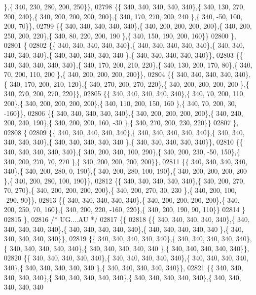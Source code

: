 \begin{DoxyCode}
      \},\{ 340, 230, 280, 200, 250\}\},
02798 \{\{ 340, 340, 340, 340, 340\},\{ 340, 130, 270, 200, 240\},\{ 340, 200, 200, 200, 200\},\{ 340, 170, 270, 200, 240
      \},\{ 340, -50, 100, 200,  70\}\},
02799 \{\{ 340, 340, 340, 340, 340\},\{ 340, 200, 200, 200, 200\},\{ 340, 200, 250, 200, 220\},\{ 340,  80, 220, 200, 190
      \},\{ 340, 150, 190, 200, 160\}\}
02800 \},
02801 \{
02802 \{\{ 340, 340, 340, 340, 340\},\{ 340, 340, 340, 340, 340\},\{ 340, 340, 340, 340, 340\},\{ 340, 340, 340, 340, 340
      \},\{ 340, 340, 340, 340, 340\}\},
02803 \{\{ 340, 340, 340, 340, 340\},\{ 340, 170, 200, 210, 220\},\{ 340, 130, 200, 170,  80\},\{ 340,  70, 200, 110, 200
      \},\{ 340, 200, 200, 200, 200\}\},
02804 \{\{ 340, 340, 340, 340, 340\},\{ 340, 170, 200, 210, 120\},\{ 340, 270, 200, 270, 220\},\{ 340, 200, 200, 200, 200
      \},\{ 340, 270, 200, 270, 220\}\},
02805 \{\{ 340, 340, 340, 340, 340\},\{ 340,  70, 200, 110, 200\},\{ 340, 200, 200, 200, 200\},\{ 340, 110, 200, 150, 160
      \},\{ 340,  70, 200,  30, -160\}\},
02806 \{\{ 340, 340, 340, 340, 340\},\{ 340, 200, 200, 200, 200\},\{ 340, 240, 200, 240, 190\},\{ 340, 200, 200, 160, -30
      \},\{ 340, 270, 200, 230, 220\}\}
02807 \},
02808 \{
02809 \{\{ 340, 340, 340, 340, 340\},\{ 340, 340, 340, 340, 340\},\{ 340, 340, 340, 340, 340\},\{ 340, 340, 340, 340, 340
      \},\{ 340, 340, 340, 340, 340\}\},
02810 \{\{ 340, 340, 340, 340, 340\},\{ 340, 200, 340, 100, 290\},\{ 340, 200, 230, -50, 150\},\{ 340, 200, 270,  70, 270
      \},\{ 340, 200, 200, 200, 200\}\},
02811 \{\{ 340, 340, 340, 340, 340\},\{ 340, 200, 280,   0, 190\},\{ 340, 200, 280, 100, 190\},\{ 340, 200, 200, 200, 200
      \},\{ 340, 200, 280, 100, 190\}\},
02812 \{\{ 340, 340, 340, 340, 340\},\{ 340, 200, 270,  70, 270\},\{ 340, 200, 200, 200, 200\},\{ 340, 200, 270,  30, 230
      \},\{ 340, 200, 100, -290,  90\}\},
02813 \{\{ 340, 340, 340, 340, 340\},\{ 340, 200, 200, 200, 200\},\{ 340, 200, 250,  70, 160\},\{ 340, 200, 220, -160, 
      220\},\{ 340, 200, 190,  90, 110\}\}
02814 \}
02815 \},
02816 \textcolor{comment}{/* UG....AU */}
02817 \{\{
02818 \{\{ 340, 340, 340, 340, 340\},\{ 340, 340, 340, 340, 340\},\{ 340, 340, 340, 340, 340\},\{ 340, 340, 340, 340, 340
      \},\{ 340, 340, 340, 340, 340\}\},
02819 \{\{ 340, 340, 340, 340, 340\},\{ 340, 340, 340, 340, 340\},\{ 340, 340, 340, 340, 340\},\{ 340, 340, 340, 340, 340
      \},\{ 340, 340, 340, 340, 340\}\},
02820 \{\{ 340, 340, 340, 340, 340\},\{ 340, 340, 340, 340, 340\},\{ 340, 340, 340, 340, 340\},\{ 340, 340, 340, 340, 340
      \},\{ 340, 340, 340, 340, 340\}\},
02821 \{\{ 340, 340, 340, 340, 340\},\{ 340, 340, 340, 340, 340\},\{ 340, 340, 340, 340, 340\},\{ 340, 340, 340, 340, 340

\end{DoxyCode}
